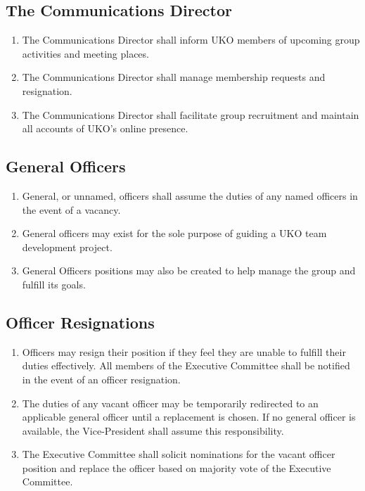 \documentclass[12pt,executivepaper]{article}
\begin{document}
\subsection{The Communications Director}
\begin{enumerate}
    \item The Communications Director shall inform UKO members of upcoming group activities
          and meeting places.
    \item The Communications Director shall manage membership requests and resignation.
    \item The Communications Director shall facilitate group recruitment and maintain all
          accounts of UKO's online presence.
\end{enumerate}

\subsection{General Officers}
\begin{enumerate}
    \item General, or unnamed, officers shall assume the duties of any named
          officers in the event of a vacancy.
    \item General officers may exist for the sole purpose of guiding a UKO team
          development project.
    \item General Officers positions may also be created to help manage the
          group and fulfill its goals.
\end{enumerate}

\subsection{Officer Resignations}
\begin{enumerate}
    \item Officers may resign their position if they feel they are unable to
          fulfill their duties effectively. All members of the Executive
          Committee shall be notified in the event of an officer resignation.
    \item The duties of any vacant officer may be temporarily redirected to
          an applicable general officer until a replacement is chosen. If
          no general officer is available, the Vice-President shall
          assume this responsibility.
    \item The Executive Committee shall solicit nominations for the vacant
          officer position and replace the officer based on majority vote of
          the Executive Committee.
\end{enumerate}
\end{document}

